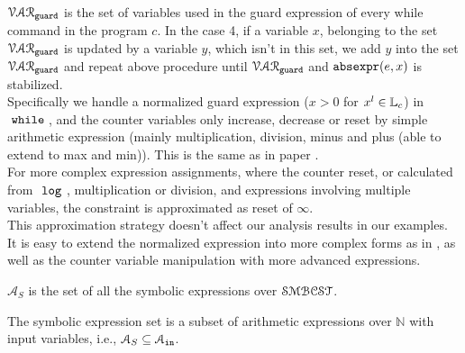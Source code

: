     $\mathcal{VAR}_{\mathtt{guard}}$ is the set of variables used in the guard expression of every while command in the program $c$. 
  In the case 4, if a variable $x$, belonging to the set 
  $\mathcal{VAR}_{\mathtt{guard}}$ is updated by a variable $y$, which isn't in this set, 
  we add $y$ into the set $\mathcal{VAR}_{\mathtt{guard}}$ and repeat 
  above procedure  until $\mathcal{VAR}_{\mathtt{guard}}$ and $\mathtt{abs}{\mathtt{expr}}(e, x)$ is stabilized. 
  \\
Specifically 
we handle a 
normalized guard expression ($ x > 0$ for $x^l \in \mathbb{L}_c$)
 in $\;\mathtt{while}\;$, and 
the counter variables only increase, decrease or reset by 
simple arithmetic expression (mainly multiplication, division, minus and plus (able to extend to max and min)). 
This is the same as in paper \cite{sinn2017complexity}. 
\\
For more complex expression assignments, where the counter reset, or calculated from $~\mathtt{log}~$, 
multiplication or division, and expressions involving multiple variables, the constraint is approximated as reset of $\infty$.
\\
This approximation strategy
doesn't affect our analysis results in our examples. It is easy to extend the normalized expression 
into more complex forms as in \cite{sinn2017complexity}, as well as the 
counter variable manipulation with more advanced expressions.
\begin{defn}
  $\mathcal{A}_{S}$ is the set of all the symbolic expressions 
over $\mathcal{SMBCST}$.
\end{defn}
The symbolic expression set is a subset of arithmetic expressions over $\mathbb{N}$ with input variables, 
i.e., $\mathcal{A}_{S} \subseteq \mathcal{A}_{\mathtt{in}}$.

